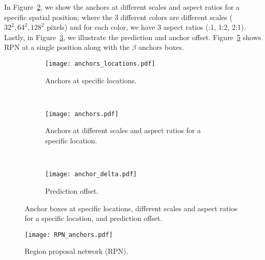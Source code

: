 In Figure~\ref{fig:anchors_b}, we show the anchors at different scales and aspect ratios for a specific spatial position;
where the 3 different colors are different scales (\eg $32^2, 64^2, 128^2$ pixels) and for each color, we have 3 aspect ratios (:1, 1:2, 2:1).
Lastly, in Figure~\ref{fig:anchors_c}, we illustrate the prediction and anchor offset.
%
Figure~\ref{fig:rpn} shows RPN at a single position along with the $\beta$ anchors boxes.
%
\begin{figure}[th!]
  \centering
  \begin{subfigure}[t]{0.49\linewidth}
    \centering
    \texttt{[image: anchors\_locations.pdf]}
    \caption{Anchors at specific locations.}
    \label{fig:anchors_a}
  \end{subfigure}~
  \begin{subfigure}[b]{0.49\linewidth}
    \centering
    \texttt{[image: anchors.pdf]}
    \caption{Anchors at different scales and aspect ratios for a specific location.}
    \label{fig:anchors_b}
  \end{subfigure}\\
  \begin{subfigure}[b]{0.49\linewidth}
    \centering
    \texttt{[image: anchor\_delta.pdf]}
    \caption{Prediction offset.}
    \label{fig:anchors_c}
  \end{subfigure}
  \caption{Anchor boxes at specific locations, different scales and aspect ratios for a specific location, and prediction offset.}
  \label{fig:anchors}
\end{figure}

%

%
\begin{figure}[th!]
	\centering
	\texttt{[image: RPN\_anchors.pdf]}
	\caption{Region proposal network (RPN).}
	\label{fig:rpn}
\end{figure}

%
